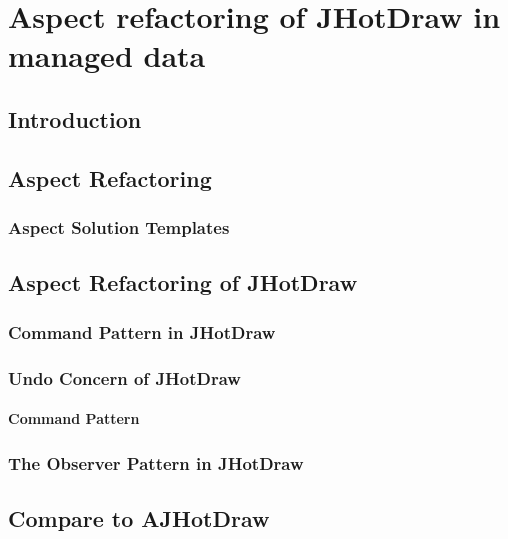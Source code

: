 
\chapter{Aspect refactoring of JHotDraw in managed data}\label{AspectRefactoring}

\section{Introduction}

\section{Aspect Refactoring}

\subsection{Aspect Solution Templates}

\section{Aspect Refactoring of JHotDraw}

\subsection{Command Pattern in JHotDraw}\label{Command Pattern in JHotDraw}

\subsection{Undo Concern of JHotDraw}\label{Undo JHotDraw}

\subsubsection{Command Pattern}

\subsection{The Observer Pattern in JHotDraw}\label{The Observer Pattern in JHotDraw}


\section{Compare to AJHotDraw}